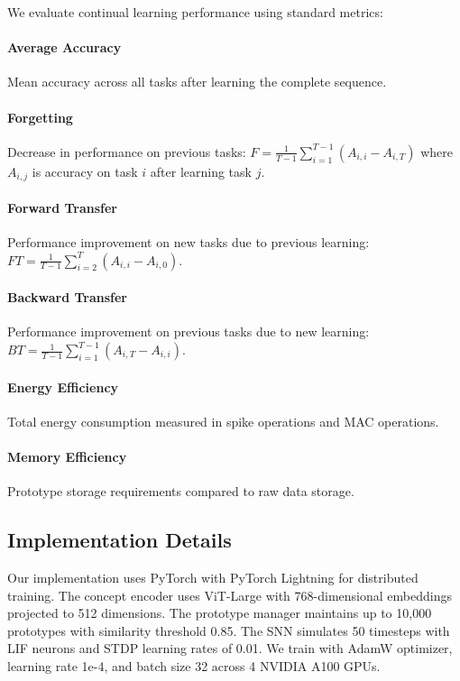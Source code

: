 \documentclass{article}
\begin{document}
We evaluate continual learning performance using standard metrics:

\paragraph{Average Accuracy} Mean accuracy across all tasks after learning the complete sequence.

\paragraph{Forgetting} Decrease in performance on previous tasks: $F = \frac{1}{T-1} \sum_{i=1}^{T-1} (A_{i,i} - A_{i,T})$ where $A_{i,j}$ is accuracy on task $i$ after learning task $j$.

\paragraph{Forward Transfer} Performance improvement on new tasks due to previous learning: $FT = \frac{1}{T-1} \sum_{i=2}^T (A_{i,i} - A_{i,0})$.

\paragraph{Backward Transfer} Performance improvement on previous tasks due to new learning: $BT = \frac{1}{T-1} \sum_{i=1}^{T-1} (A_{i,T} - A_{i,i})$.

\paragraph{Energy Efficiency} Total energy consumption measured in spike operations and MAC operations.

\paragraph{Memory Efficiency} Prototype storage requirements compared to raw data storage.

\subsection{Implementation Details}

Our implementation uses PyTorch with PyTorch Lightning for distributed training. The concept encoder uses ViT-Large with 768-dimensional embeddings projected to 512 dimensions. The prototype manager maintains up to 10,000 prototypes with similarity threshold 0.85. The SNN simulates 50 timesteps with LIF neurons and STDP learning rates of 0.01. We train with AdamW optimizer, learning rate 1e-4, and batch size 32 across 4 NVIDIA A100 GPUs.
\end{document}
